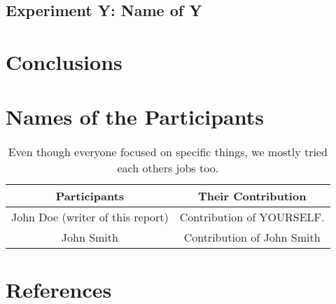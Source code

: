 \documentclass[11pt]{article}
\begin{document}
\subsection{Experiment Y: Name of Y} 




\vspace{-1cm}
\section{Conclusions}



\section{Names of the Participants}


\begin{table}[H]
    \centering
    \begin{tabular}{| c : c |}
    \hline
        \textbf{Participants} & \textbf{Their Contribution} \\
    \hline\hline
        John Doe (writer of this report) & Contribution of YOURSELF. \\
    \hline
        John Smith & Contribution of John Smith \\
    \hline
    \end{tabular}
    \caption{Even though everyone focused on specific things, we mostly tried each others jobs too.}
\end{table}



\section{References}


\vspace{-1cm} %
\end{document}
